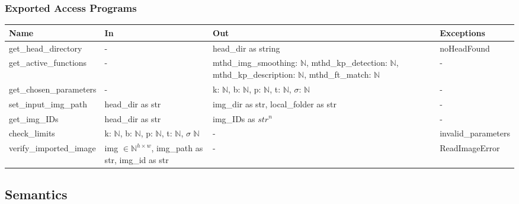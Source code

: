 \documentclass[12pt, titlepage]{article}
\begin{document}
\subsubsection{Exported Access Programs}
\begin{tabular}{p{4cm} p{4cm} p{4.5cm} p{3.5cm}}
\hline
\textbf{Name} & \textbf{In} & \textbf{Out} & \textbf{Exceptions} \\
\hline
get\_head\_directory 
& - 
& head\_dir as string 
& noHeadFound \\
\hline
get\_active\_functions 
& - 
& mthd\_img\_smoothing: $\mathbb{N}$, \newline 
mthd\_kp\_detection: $\mathbb{N}$, \newline 
mthd\_kp\_description: $\mathbb{N}$, \newline 
mthd\_ft\_match: $\mathbb{N}$
& - \\
\hline
get\_chosen\_parameters & - 
& k: $\mathbb{N}$, \newline 
b: $\mathbb{N}$, \newline  
p: $\mathbb{N}$, \newline 
t: $\mathbb{N}$, \newline 
$\sigma$: $\mathbb{N}$
& - \\
\hline
set\_input\_img\_path 
& head\_dir as str
& img\_dir as str, \newline 
local\_folder as str
& - \\
\hline
get\_img\_IDs 
& head\_dir as str 
& img\_IDs as $str^{n}$ 
& - \\
\hline
check\_limits 
& k: $\mathbb{N}$, \newline 
b: $\mathbb{N}$, \newline  
p: $\mathbb{N}$, \newline 
t: $\mathbb{N}$, \newline 
$\sigma$ $\mathbb{N}$
& - 
& invalid\_parameters\\
\hline 
verify\_imported\_image 
& img $\in \mathbb{N}^{h \times w}$, \newline 
img\_path as str, \newline 
img\_id as str
& -
& ReadImageError\\
\hline
\end{tabular}


\subsection{Semantics}
\end{document}

